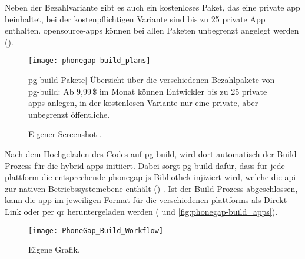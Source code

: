 {Neben der Bezahlvariante gibt es auch ein kostenloses Paket, das eine private \gls{app} beinhaltet, bei der kostenpflichtigen Variante sind bis zu 25 private App enthalten.
\gls{opensource}-\glspl{app} können bei allen Paketen unbegrenzt angelegt werden ().

\begin{figure}[h!]
\centering
\texttt{[image: phonegap-build\_plans]}
	\caption
		[\gls{pg-build}-Pakete]
		{Übersicht über die verschiedenen Bezahlpakete von \gls{pg-build}: Ab 9,99\,\$ im Monat können Entwickler bis zu 25 private \glspl{app} anlegen, in der kostenlosen Variante nur eine private, aber unbegrenzt öffentliche.}
		\label{fig:phonegap-build_plans}
	\imagesourcefont
	\vspace{\imagesourcespace}
	\imagesourcefont{}
	\caption*{\imagesourcelabel Eigener Screenshot \cite{Adobe_PhoneGap_Build_Plans}.}
\end{figure}


Nach dem Hochgeladen des Codes auf \gls{pg-build}, wird dort automatisch der Build-Prozess für die \glspl{hybrid-app} initiiert.
Dabei sorgt \gls{pg-build} dafür, dass für jede \gls{plattform} die entsprechende \gls{phonegap}-\gls{js}-Bibliothek injiziert wird, welche die \gls{api} zur nativen Betriebssystemebene enthält () \cite{PhoneGap_Build_Documentation_getting-started}.
Ist der Build-Prozess abgeschlossen, kann die \gls{app} im jeweiligen Format für die verschiedenen \glspl{plattform} als Direkt-Link oder per \gls{qr} heruntergeladen werden ( und \ref{fig:phonegap-build_apps}).

\begin{figure}[h!]
\centering
\texttt{[image: PhoneGap\_Build\_Workflow]}
	\caption[\gls{pg-build}-Workflow]{Schematische Darstellung eines möglichen Entwicklungsworkflows mit \gls{pg-build}: Der Code wird als Web-Anwendung auf \gls{github} hochgeladen, bei \gls{pg-build} über das \gls{github}-Repository aktualisiert und für die jeweiligen \glspl{plattform} gebaut, sodass die plattformspezifischen \glspl{app} heruntergeladen und auf den Zielgeräten installiert werden können.}
	\label{fig:phonegap_build_workflow}
	\imagesourcefont
	\vspace{\imagesourcespace}
	\imagesourcefont{}
	\caption*{\imagesourcelabel Eigene Grafik.}
\end{figure}


}
